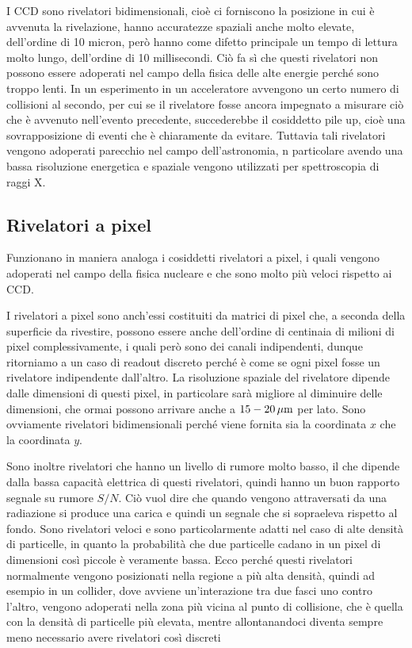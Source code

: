 I CCD sono rivelatori bidimensionali, cioè ci forniscono la posizione in cui è avvenuta la rivelazione, hanno accuratezze spaziali anche molto elevate, dell'ordine di 10 micron, però hanno come difetto principale un tempo di lettura molto lungo, dell'ordine di 10 millisecondi. Ciò fa sì che questi rivelatori non possono essere adoperati nel campo della fisica delle alte energie perché sono troppo lenti. In un esperimento in un acceleratore avvengono un certo numero di collisioni al secondo, per cui se il rivelatore fosse ancora impegnato a misurare ciò che è avvenuto nell'evento precedente, succederebbe il cosiddetto pile up, cioè una sovrapposizione di eventi che è chiaramente da evitare. Tuttavia tali rivelatori vengono adoperati parecchio nel campo dell'astronomia, n particolare avendo una bassa risoluzione energetica e spaziale vengono utilizzati per spettroscopia di raggi X.

\subsection{Rivelatori a pixel}

Funzionano in maniera analoga i cosiddetti rivelatori a pixel, i quali vengono adoperati nel campo della fisica nucleare e che sono molto più veloci rispetto ai CCD.

I rivelatori a pixel sono anch'essi costituiti da matrici di pixel che, a seconda della superficie da rivestire, possono essere anche dell'ordine di centinaia di milioni di pixel complessivamente, i quali però sono dei canali indipendenti, dunque ritorniamo a un caso di readout discreto perché è come se ogni pixel fosse un rivelatore indipendente dall'altro. La risoluzione spaziale del rivelatore dipende dalle dimensioni di questi pixel, in particolare sarà migliore al diminuire delle dimensioni, che ormai possono arrivare anche a $15-20 \, \rm \mu m$ per lato. Sono ovviamente rivelatori bidimensionali perché viene fornita sia la coordinata $x$ che la coordinata $y$.

Sono inoltre rivelatori che hanno un livello di rumore molto basso, il che dipende dalla bassa capacità elettrica di questi rivelatori, quindi hanno un buon rapporto segnale su rumore $S/N$. Ciò vuol dire che quando vengono attraversati da una radiazione si produce una carica e quindi un segnale che si sopraeleva rispetto al fondo. Sono rivelatori veloci e sono particolarmente adatti nel caso di alte densità di particelle, in quanto la probabilità che due particelle cadano in un pixel di dimensioni così piccole è veramente bassa. Ecco perché questi rivelatori normalmente vengono posizionati nella regione a più alta densità, quindi ad esempio in un collider, dove avviene un'interazione tra due fasci uno contro l'altro, vengono adoperati nella zona più vicina al punto di collisione, che è quella con la densità di particelle più elevata, mentre allontanandoci diventa sempre meno necessario avere rivelatori così discreti

